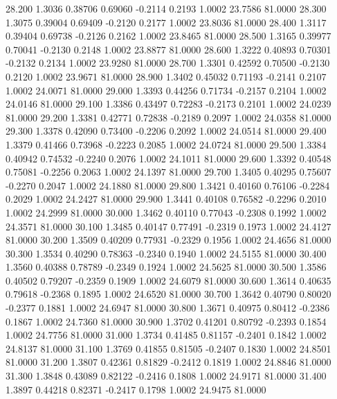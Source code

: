   28.200   1.3036   0.38706   0.69060  -0.2114   0.2193   1.0002  23.7586  81.0000
  28.300   1.3075   0.39004   0.69409  -0.2120   0.2177   1.0002  23.8036  81.0000
  28.400   1.3117   0.39404   0.69738  -0.2126   0.2162   1.0002  23.8465  81.0000
  28.500   1.3165   0.39977   0.70041  -0.2130   0.2148   1.0002  23.8877  81.0000
  28.600   1.3222   0.40893   0.70301  -0.2132   0.2134   1.0002  23.9280  81.0000
  28.700   1.3301   0.42592   0.70500  -0.2130   0.2120   1.0002  23.9671  81.0000
  28.900   1.3402   0.45032   0.71193  -0.2141   0.2107   1.0002  24.0071  81.0000
  29.000   1.3393   0.44256   0.71734  -0.2157   0.2104   1.0002  24.0146  81.0000
  29.100   1.3386   0.43497   0.72283  -0.2173   0.2101   1.0002  24.0239  81.0000
  29.200   1.3381   0.42771   0.72838  -0.2189   0.2097   1.0002  24.0358  81.0000
  29.300   1.3378   0.42090   0.73400  -0.2206   0.2092   1.0002  24.0514  81.0000
  29.400   1.3379   0.41466   0.73968  -0.2223   0.2085   1.0002  24.0724  81.0000
  29.500   1.3384   0.40942   0.74532  -0.2240   0.2076   1.0002  24.1011  81.0000
  29.600   1.3392   0.40548   0.75081  -0.2256   0.2063   1.0002  24.1397  81.0000
  29.700   1.3405   0.40295   0.75607  -0.2270   0.2047   1.0002  24.1880  81.0000
  29.800   1.3421   0.40160   0.76106  -0.2284   0.2029   1.0002  24.2427  81.0000
  29.900   1.3441   0.40108   0.76582  -0.2296   0.2010   1.0002  24.2999  81.0000
  30.000   1.3462   0.40110   0.77043  -0.2308   0.1992   1.0002  24.3571  81.0000
  30.100   1.3485   0.40147   0.77491  -0.2319   0.1973   1.0002  24.4127  81.0000
  30.200   1.3509   0.40209   0.77931  -0.2329   0.1956   1.0002  24.4656  81.0000
  30.300   1.3534   0.40290   0.78363  -0.2340   0.1940   1.0002  24.5155  81.0000
  30.400   1.3560   0.40388   0.78789  -0.2349   0.1924   1.0002  24.5625  81.0000
  30.500   1.3586   0.40502   0.79207  -0.2359   0.1909   1.0002  24.6079  81.0000
  30.600   1.3614   0.40635   0.79618  -0.2368   0.1895   1.0002  24.6520  81.0000
  30.700   1.3642   0.40790   0.80020  -0.2377   0.1881   1.0002  24.6947  81.0000
  30.800   1.3671   0.40975   0.80412  -0.2386   0.1867   1.0002  24.7360  81.0000
  30.900   1.3702   0.41201   0.80792  -0.2393   0.1854   1.0002  24.7756  81.0000
  31.000   1.3734   0.41485   0.81157  -0.2401   0.1842   1.0002  24.8137  81.0000
  31.100   1.3769   0.41855   0.81505  -0.2407   0.1830   1.0002  24.8501  81.0000
  31.200   1.3807   0.42361   0.81829  -0.2412   0.1819   1.0002  24.8846  81.0000
  31.300   1.3848   0.43089   0.82122  -0.2416   0.1808   1.0002  24.9171  81.0000
  31.400   1.3897   0.44218   0.82371  -0.2417   0.1798   1.0002  24.9475  81.0000
